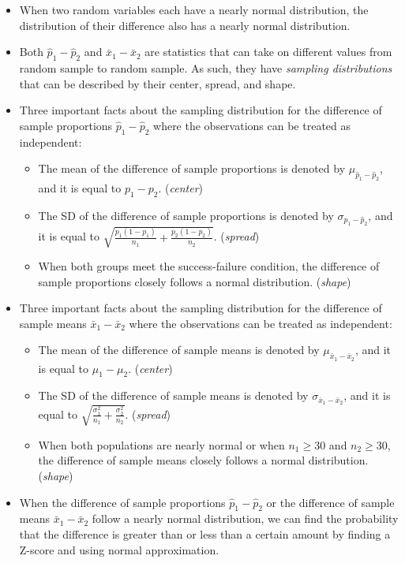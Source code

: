 \begin{itemize}
\item When two random variables each have a nearly normal distribution, the distribution of their difference also has a nearly normal distribution.

\item Both $\hat{p}_1-\hat{p}_2$ and $\bar{x}_1-\bar{x}_2$ are statistics that can take on different values from random sample to random sample.  As such, they have \emph{sampling distributions} that can be described by their center, spread, and shape.

\item Three important facts about the sampling distribution for the difference of sample proportions $\hat{p}_1-\hat{p}_2$ where the observations can be treated as independent:
\begin{itemize}\vspace{-1mm}
\setlength{\itemsep}{0mm}
\item The mean of the difference of sample proportions is denoted by $\mu_{\hat{p}_1-\hat{p}_2}$, and it is equal to $p_1-p_2$. (\textit{center})
\item The SD of the difference of sample proportions is denoted by $\sigma_{\hat{p}_1-\hat{p}_2}$, and it is equal to $\sqrt{\frac{p_1(1-p_1)}{n_1} + \frac{p_2(1-p_2)}{n_2}}$.  (\textit{spread})
\item When both groups meet the success-failure condition, the difference of sample proportions closely follows a normal distribution.   (\textit{shape})
\end{itemize}


\item Three important facts about the sampling distribution for the difference of sample means $\bar{x}_1-\bar{x}_2$ where the observations can be treated as independent:
\begin{itemize}\vspace{-1mm}
\setlength{\itemsep}{0mm}
\item The mean of the difference of sample means is denoted by $\mu_{\bar{x}_1-\bar{x}_2}$, and it is equal to $\mu_1-\mu_2$. (\textit{center})
\item The SD of the difference of sample means is denoted by $\sigma_{\bar{x}_1-\bar{x}_2}$, and it is equal to $ \sqrt{\frac{\sigma_1^2}{n_1} + \frac{\sigma_2^2}{n_2}}$.  (\textit{spread})
\item When both populations are nearly normal or when $n_1\ge 30$ and $n_2\ge 30$, the difference of sample means closely follows a normal distribution.   (\textit{shape})
\end{itemize}

\item When the difference of sample proportions $\hat{p}_1-\hat{p}_2 $ or the difference of sample means $\bar{x}_1-\bar{x}_2$ follow a nearly normal distribution, we can find the probability that the difference is greater than or less than a certain amount by finding a Z-score and using normal approximation.  

\end{itemize}

